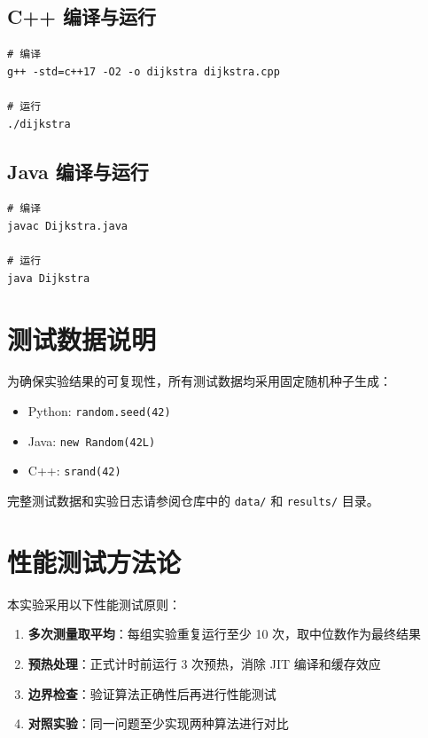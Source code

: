 \documentclass[12pt,a4paper,UTF8]{article}
\begin{document}
\begin{appendix}
\subsection{C++ 编译与运行}

\begin{lstlisting}[style=bash-style]
# 编译
g++ -std=c++17 -O2 -o dijkstra dijkstra.cpp

# 运行
./dijkstra
\end{lstlisting}

\subsection{Java 编译与运行}

\begin{lstlisting}[style=bash-style]
# 编译
javac Dijkstra.java

# 运行
java Dijkstra
\end{lstlisting}

\section{测试数据说明}

为确保实验结果的可复现性，所有测试数据均采用固定随机种子生成：

\begin{itemize}
    \item Python: \texttt{random.seed(42)}
    \item Java: \texttt{new Random(42L)}
    \item C++: \texttt{srand(42)}
\end{itemize}

完整测试数据和实验日志请参阅仓库中的 \texttt{data/} 和 \texttt{results/} 目录。

\section{性能测试方法论}

本实验采用以下性能测试原则：

\begin{enumerate}
    \item \textbf{多次测量取平均}：每组实验重复运行至少 10 次，取中位数作为最终结果
    \item \textbf{预热处理}：正式计时前运行 3 次预热，消除 JIT 编译和缓存效应
    \item \textbf{边界检查}：验证算法正确性后再进行性能测试
    \item \textbf{对照实验}：同一问题至少实现两种算法进行对比
\end{enumerate}

\end{appendix}

\end{document}
